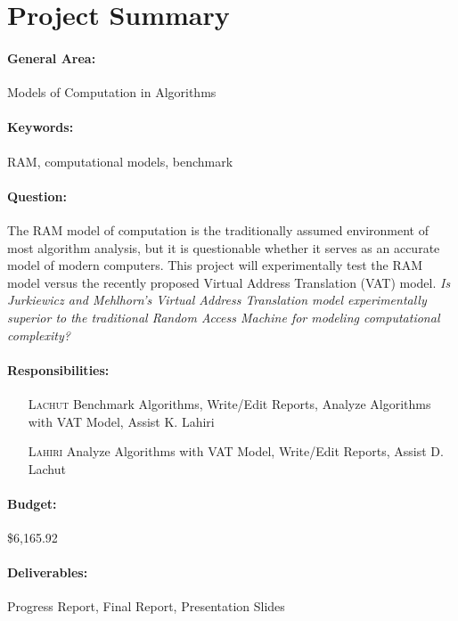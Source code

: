 \maketitle

\section{Project Summary}

\paragraph{General Area:} Models of Computation in Algorithms

\paragraph{Keywords:} RAM, computational models, benchmark

\paragraph{Question:} The RAM model of computation is the traditionally
assumed environment of most algorithm analysis, but it is questionable whether
it serves as an accurate model of modern computers. This project will
experimentally test the RAM model versus the recently proposed Virtual Address
Translation (VAT) model.
\emph{Is Jurkiewicz and Mehlhorn's Virtual Address Translation model
experimentally superior to the traditional Random Access Machine for modeling
computational complexity?}

\paragraph{Responsibilities:}
  \begin{itemize}
    \item[\textsc{Lachut}] Benchmark Algorithms, Write/Edit Reports, Analyze
    Algorithms with VAT Model, Assist K. Lahiri
    \item[\textsc{Lahiri}] Analyze Algorithms with VAT Model, Write/Edit
    Reports, Assist D. Lachut
  \end{itemize}

\paragraph{Budget:} \$6,165.92

\paragraph{Deliverables:} Progress Report, Final Report, Presentation Slides